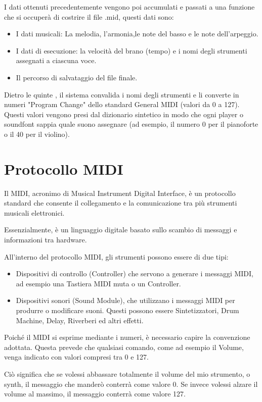 I dati ottenuti precedentemente vengono poi accumulati e passati a una funzione che si occuperà di costrire il file .mid, questi dati sono:
\begin{itemize}
    \item I dati musicali: La melodia, l'armonia,le note del basso e le note dell'arpeggio.
    \item I dati di esecuzione: la velocità del brano (tempo) e i nomi degli strumenti assegnati a ciascuna voce.
    \item Il percorso di salvataggio del file finale.
\end{itemize}

Dietro le quinte , il sistema convalida i nomi degli strumenti e li converte in numeri "Program Change" dello standard General MIDI (valori da 0 a 127). Questi valori vengono presi dal dizionario sintetico in modo che ogni player o soundfont sappia quale suono assegnare (ad esempio, il numero 0 per il pianoforte o il 40 per il violino).


\section{Protocollo MIDI}
Il MIDI, acronimo di Musical Instrument Digital Interface, è un protocollo standard che consente il collegamento e la comunicazione tra più strumenti musicali elettronici.

Essenzialmente, è un linguaggio digitale basato sullo scambio di messaggi e informazioni tra hardware.

All’interno del protocollo MIDI, gli strumenti possono essere di due tipi:
\begin{itemize}
    \item Dispositivi di controllo (Controller) che servono a generare i messaggi MIDI, ad esempio una Tastiera MIDI muta o un Controller.
    \item Dispositivi sonori (Sound Module), che utilizzano i messaggi MIDI per produrre o modificare suoni. Questi possono essere Sintetizzatori, Drum Machine, Delay, Riverberi ed altri effetti.
\end{itemize}
Poiché il MIDI si esprime mediante i numeri, è necessario capire la convenzione adottata. Questa prevede che qualsiasi comando, come ad esempio il Volume, venga indicato con valori compresi tra 0 e 127.

Ciò significa che se volessi abbassare totalmente il volume del mio strumento, o synth, il messaggio che manderò conterrà come valore 0. Se invece volessi alzare il volume al massimo, il messaggio conterrà come valore 127. 

